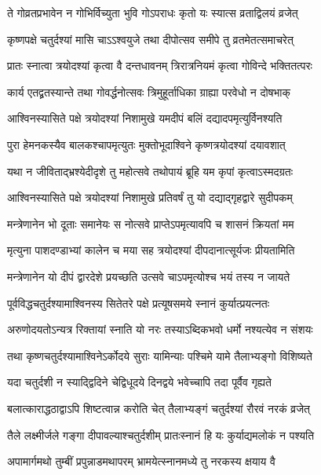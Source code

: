 \twolineshloka
{ते गोव्रतप्रभावेन न गोभिर्विच्युता भुवि}
{गोऽपराधः कृतो यः स्यात्स व्रताद्विलयं व्रजेत्} %


\twolineshloka
{कृष्णपक्षे चतुर्दश्यां मासि चाऽऽश्वयुजे तथा}
{दीपोत्सव समीपे तु व्रतमेतत्समाचरेत्} %

\twolineshloka
{प्रातः स्नात्वा त्रयोदश्यां कृत्वा वै दन्तधावनम्}
{त्रिरात्रनियमं कृत्वा गोविन्दे भक्तितत्परः} %

\twolineshloka
{कार्य एतद्व्रतस्यान्ते तथा गोवर्द्धनोत्सवः}
{त्रिमुहूर्ताधिका ग्राह्या परवेधो न दोषभाक्} %

\twolineshloka
{आश्विनस्यासिते पक्षे त्रयोदश्यां निशामुखे}
{यमदीपं बलिं दद्यादपमृत्युर्विनश्यति} %

\twolineshloka
{पुरा हेमनकस्यैव बालकश्चापमृत्युतः}
{मुक्तोभूदाश्विने कृष्णत्रयोदश्यां दयावशात्} %

\twolineshloka
{यथा न जीविताद्भ्रश्येदीदृशे तु महोत्सवे}
{तथोपायं ब्रूहि यम कृपां कृत्वाऽस्मदग्रतः} %


\twolineshloka
{आश्विनस्यासिते पक्षे त्रयोदश्यां निशामुखे}
{प्रतिवर्षं तु यो दद्याद्गृहद्वारे सुदीपकम्} %

\twolineshloka
{मन्त्रेणानेन भो दूताः समानेयः स नोत्सवे}
{प्राप्तेऽपमृत्यावपि च शासनं क्रियतां मम} %

\twolineshloka
{मृत्युना पाशदण्डाभ्यां कालेन च मया सह}
{त्रयोदश्यां दीपदानात्सूर्यजः प्रीयतामिति} %

\twolineshloka
{मन्त्रेणानेन यो दीपं द्वारदेशे प्रयच्छति}
{उत्सवे चाऽपमृत्योश्च भयं तस्य न जायते} %


\twolineshloka
{पूर्वविद्धचतुर्दश्यामाश्विनस्य सितेतरे}
{पक्षे प्रत्यूषसमये स्नानं कुर्यात्प्रयत्नतः} %

\twolineshloka
{अरुणोदयतोऽन्यत्र रिक्तायां स्नाति यो नरः}
{तस्याऽब्दिकभवो धर्मो नश्यत्येव न संशयः} %

\twolineshloka
{तथा कृष्णचतुर्दश्यामाश्विनेऽर्कोदये सुराः}
{यामिन्याः पश्चिमे यामे तैलाभ्यङ्गो विशिष्यते} %

\twolineshloka
{यदा चतुर्दशी न स्याद्द्विदिने चेद्विधूदये}
{दिनद्वये भवेच्चापि तदा पूर्वैव गृह्यते} %

\twolineshloka
{बलात्काराद्धठाद्वाऽपि शिष्टत्वान्न करोति चेत्}
{तैलाभ्यङ्गं चतुर्दश्यां रौरवं नरकं व्रजेत्} %

\twolineshloka
{तैले लक्ष्मीर्जले गङ्गा दीपावल्याश्चतुर्दशीम्}
{प्रातःस्नानं हि यः कुर्याद्यमलोकं न पश्यति} %

\twolineshloka
{अपामार्गमथो तुम्बीं प्रपुन्नाडमथापरम्}
{भ्रामयेत्स्नानमध्ये तु नरकस्य क्षयाय वै} %


